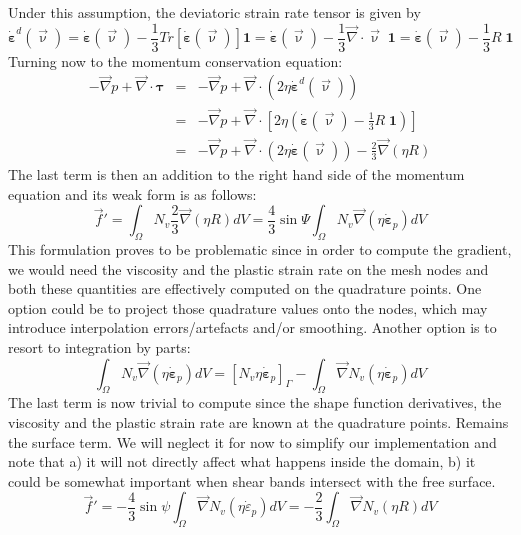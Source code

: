 Under this assumption, the deviatoric strain rate tensor is given by
\begin{equation}
\dot{\bm \varepsilon}^d(\vec\upnu)
= \dot{\bm \varepsilon}(\vec\upnu)- \frac{1}{3} Tr[\dot{\bm \varepsilon}(\vec\upnu)] {\bm 1}
= \dot{\bm \varepsilon}(\vec\upnu)- \frac{1}{3} \vec\nabla\cdot\vec\upnu \; {\bm 1}
= \dot{\bm \varepsilon}(\vec\upnu)- \frac{1}{3} R \; {\bm 1}
\end{equation}
Turning now to the momentum conservation equation:
\begin{eqnarray}
-\vec\nabla p + \vec\nabla \cdot {\bm \tau} 
&=& -\vec\nabla p + \vec\nabla \cdot (2 \eta \dot{\bm \varepsilon}^d(\vec\upnu)) \nonumber \\
&=& -\vec\nabla p + \vec\nabla \cdot \left[ 2 \eta \left(\dot{\bm \varepsilon}(\vec\upnu)- \frac{1}{3} R \; {\bm 1}\right) \right] \nonumber\\
&=& -\vec\nabla p 
+ \vec\nabla \cdot \left( 2 \eta \dot{\bm \varepsilon}(\vec\upnu)\right) -\frac{2}{3} \vec\nabla(\eta R) 
\label{chpeform}
\end{eqnarray}
The last term is then an addition to the right hand side of the momentum equation 
and its weak form is as follows:
\begin{equation}
\vec f' 
= \int_\Omega N_v \frac{2}{3} \vec\nabla(\eta R) dV
= \frac{4}{3} \sin \Psi \int_\Omega N_v \vec\nabla(\eta \dot{\bm \varepsilon}_p) dV
\end{equation}
This formulation proves to be problematic since in order to compute the gradient, we would
need the viscosity and the plastic strain rate on the mesh nodes and both these quantities
are effectively computed on the quadrature points. One option could be to project those quadrature
values onto the nodes, which may introduce interpolation errors/artefacts and/or smoothing. 
Another option is to resort to integration by parts:
\begin{equation}
\int_\Omega N_v \vec\nabla(\eta \dot{\bm \varepsilon}_p) dV
= \left[ N_v \eta \dot{\bm \varepsilon}_p \right]_\Gamma 
-\int_\Omega \vec\nabla N_v (\eta \dot{\bm \varepsilon}_p) dV
\end{equation}
The last term is now trivial to compute since the shape function derivatives, the viscosity
and the plastic strain rate are known at the quadrature points. Remains the surface term. 
We will neglect it for now to simplify our implementation and note that a) it will not directly 
affect what happens inside the domain, b) it could be somewhat important when shear bands
intersect with the free surface. 
\begin{equation}
\vec f' 
=
-\frac{4}{3}\sin\psi\int_\Omega \vec\nabla N_v (\eta \dot{\varepsilon}_p) dV
=
-\frac{2}{3} \int_\Omega \vec\nabla N_v (\eta R) dV
\end{equation}

